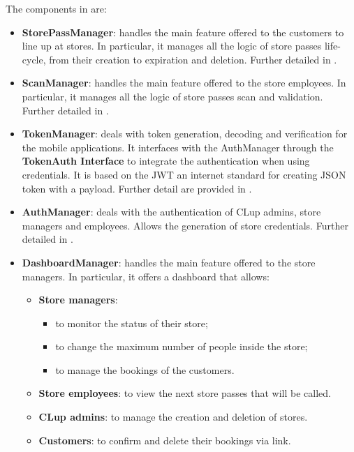 The components in  are:
\begin{itemize}
	\item \textbf{StorePassManager}: handles the main feature offered to the customers to line up at stores. In particular, it manages all the logic of store passes life-cycle, from their creation to expiration and deletion. Further detailed in .
	
	\item \textbf{ScanManager}: handles the main feature offered to the store employees. In particular, it manages all the logic of store passes scan and validation. Further detailed in .
	
	\item \textbf{TokenManager}: deals with token generation, decoding and verification for the mobile applications. It interfaces with the AuthManager through the \textbf{TokenAuth Interface} to integrate the authentication when using credentials. It is based on the JWT an internet standard for creating JSON token with a payload. Further detail are provided in .
	
	\item \textbf{AuthManager}: deals with the authentication of CLup admins, store managers and employees. Allows the generation of store credentials. Further detailed in .
	
	\item \textbf{DashboardManager}: handles the main feature offered to the store managers. In particular, it offers a dashboard that allows:
	\begin{itemize}
		\item \textbf{Store managers}:
				\begin{itemize}
					\item to monitor the status of their store;
					\item to change the maximum number of people inside the store;
					\item to manage the bookings of the customers.
				\end{itemize}
			
		\item \textbf{Store employees}: to view the next store passes that will be called.
		\item \textbf{CLup admins}: to manage the creation and deletion of stores.
		\item \textbf{Customers}: to confirm and delete their bookings via link.
	\end{itemize}
	

\end{itemize}
